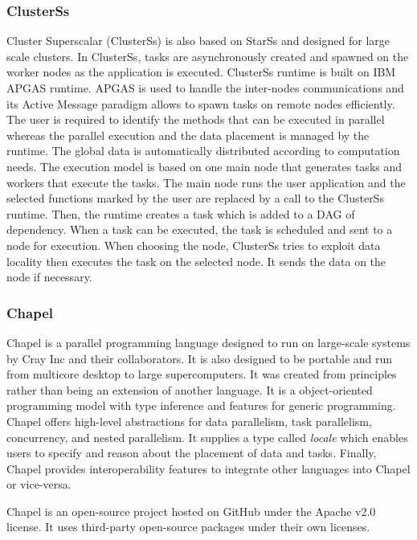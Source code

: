 \subsubsection{ClusterSs}
Cluster Superscalar (ClusterSs) \cite{TFGBA2011} is also based on StarSs \cite{PerRL2007} and designed for large scale clusters.
In ClusterSs, tasks are asynchronously created and spawned on the worker nodes as the application is executed.
ClusterSs runtime is built on IBM APGAS runtime.
APGAS is used to handle the inter-nodes communications and its Active Message paradigm allows to spawn tasks on remote nodes efficiently.
The user is required to identify the methods that can be executed in parallel whereas the parallel execution and the data placement is managed by the runtime.
The global data is automatically distributed according to computation needs.
The execution model is based on one main node that generates tasks and workers that execute the tasks.
The main node runs the user application and the selected functions marked by the user are replaced by a call to the ClusterSs runtime.
Then, the runtime creates a task which is added to a DAG of dependency.
When a task can be executed, the task is scheduled and sent to a node for execution.
When choosing the node, ClusterSs tries to exploit data locality then executes the task on the selected node.
It sends the data on the node if necessary.

\subsubsection{Chapel}
Chapel \cite{CalCZ2004} is a parallel programming language designed to run on large-scale systems by Cray Inc and their collaborators.
It is also designed to be portable and run from multicore desktop to large supercomputers.
It was created from principles rather than being an extension of another language.
It is a object-oriented programming model with type inference and features for generic programming.
Chapel offers high-level abstractions for data parallelism, task parallelism, concurrency, and nested parallelism.
It supplies a type called \textit{locale} which enables users to specify and reason about the placement of data and tasks.
Finally, Chapel provides interoperability features to integrate other languages into Chapel or vice-versa.

Chapel is an open-source project hosted on GitHub under the Apache v2.0 license.
It uses third-party open-source packages under their own licenses.

